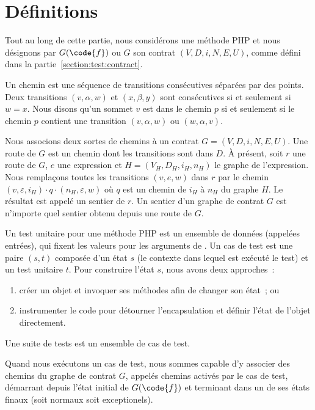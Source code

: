 \section{Définitions}
\label{section:test:definitions}

Tout au long de cette partie, nous considérons une méthode PHP  et nous
désignons par $G(\code{f})$ ou $G$ son contrat $(V, D, i, N, E, U)$, comme
défini dans la partie~\ref{section:test:contract}.

Un {\strong chemin} est une séquence de transitions consécutives séparées par
des points. Deux transitions $(v, \alpha, w)$ et $(x, \beta, y)$ sont
consécutives si et seulement si $w = x$. Nous disons qu'un sommet $v$ {\strong
est dans} le chemin $p$ si et seulement si le chemin $p$ contient une transition
$(v, \alpha, w)$ ou $(w, \alpha, v)$.

Nous associons deux sortes de chemins à un contrat $G = (V, D, i, N, E, U)$. Une
{\strong route} de $G$ est un chemin dont les transitions sont dans $D$. À
présent, soit $r$ une route de $G$, $e$ une expression et $H = (V_H, D_H, i_H,
n_H)$ le graphe de l'expression. Nous remplaçons toutes les transitions $(v, e,
w)$ dans $r$ par le chemin $(v, \varepsilon, i_H) \cdot q \cdot (n_H,
\varepsilon, w)$ où $q$ est un chemin de $i_H$ à $n_H$ du graphe $H$. Le
résultat est appelé un {\strong sentier} de $r$. Un sentier d'un graphe de
contrat $G$ est n'importe quel sentier obtenu depuis une route de $G$.

Un {\strong test unitaire} pour une méthode PHP  est un ensemble de
données (appelées entrées), qui fixent les valeurs pour les
arguments de . Un {\strong cas de test} est une paire $(s, t)$ composée
d'un état $s$ (le contexte dans lequel est exécuté le test) et un test unitaire
$t$. Pour construire l'état $s$, nous avons deux approches~:
%
\begin{enumerate}

\item créer un objet et invoquer ses méthodes afin de changer son état~; ou

\item instrumenter le code pour détourner l'encapsulation et définir l'état de
l'objet directement.

\end{enumerate}
%
Une {\strong suite de tests} est un ensemble de cas de test.

Quand nous exécutons un cas de test, nous sommes capable d'y associer des
chemins du graphe de contrat $G$, appelés chemins {\strong activés par} le cas
de test, démarrant depuis l'état initial de $G(\code{f})$ et terminant dans un
de ses états finaux (soit normaux soit exceptionels).

